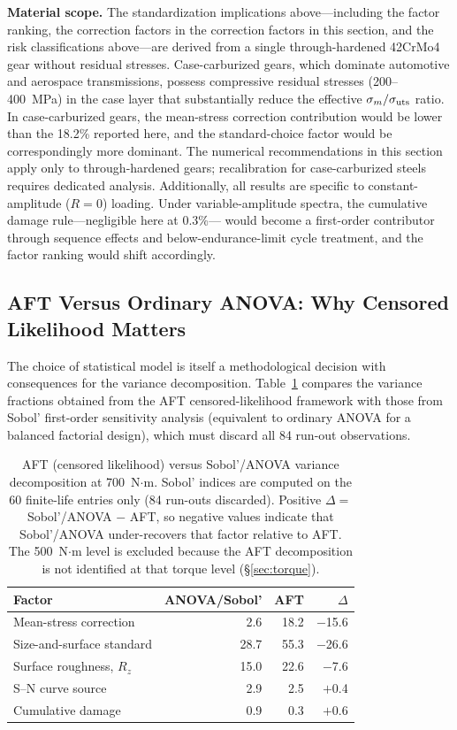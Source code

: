 \documentclass[twocolumn,12pt,a4paper]{article}
\begin{document}
\textbf{Material scope.} The standardization implications
above---including the factor ranking, the correction factors in
the correction factors in this section, and the risk classifications
above---are derived from a single through-hardened
42CrMo4 gear without residual stresses. Case-carburized gears, which
dominate automotive and aerospace transmissions, possess compressive
residual stresses (200--400~MPa) in the case layer that substantially
reduce the effective $\sigma_m/\sigma_{\rm uts}$ ratio. In
case-carburized gears, the mean-stress correction contribution would
be lower than the 18.2\% reported here, and the standard-choice
factor would be correspondingly more dominant. The numerical recommendations in this section apply only to
through-hardened gears; recalibration for case-carburized steels
requires dedicated analysis. Additionally, all results are specific
to constant-amplitude ($R=0$) loading. Under variable-amplitude
spectra, the cumulative damage rule---negligible here at 0.3\%---%
would become a first-order contributor through sequence effects and
below-endurance-limit cycle treatment, and the factor ranking would
shift accordingly.

\subsection{AFT Versus Ordinary ANOVA: Why Censored Likelihood Matters}
\label{sec:aft_vs_anova}

The choice of statistical model is itself a methodological decision
with consequences for the variance decomposition. Table~\ref{tab:aft_vs_anova}
compares the variance fractions obtained from the AFT censored-likelihood
framework with those from Sobol' first-order sensitivity analysis
(equivalent to ordinary ANOVA for a balanced factorial design), which
must discard all 84 run-out observations.

\begin{table}[ht]
\centering
\caption{AFT (censored likelihood) versus Sobol'/ANOVA variance
decomposition at 700~N$\cdot$m. Sobol' indices are computed on the
60 finite-life entries only (84 run-outs discarded). Positive
$\Delta = $ Sobol'/ANOVA $-$ AFT, so negative values indicate that
Sobol'/ANOVA under-recovers that factor relative to AFT. The
500~N$\cdot$m level is excluded because the AFT decomposition is not
identified at that torque level (\S\ref{sec:torque}).\label{tab:aft_vs_anova}}
\footnotesize
\begin{tabular}{lrrr}
\toprule
Factor & ANOVA/Sobol' & AFT & $\Delta$ \\
\midrule
Mean-stress correction & 2.6 & 18.2 & $-$15.6 \\
Size-and-surface standard & 28.7 & 55.3 & $-$26.6 \\
Surface roughness, $R_z$ & 15.0 & 22.6 & $-$7.6 \\
S--N curve source & 2.9 & 2.5 & $+$0.4 \\
Cumulative damage & 0.9 & 0.3 & $+$0.6 \\
\bottomrule
\end{tabular}
\end{table}
\end{document}
